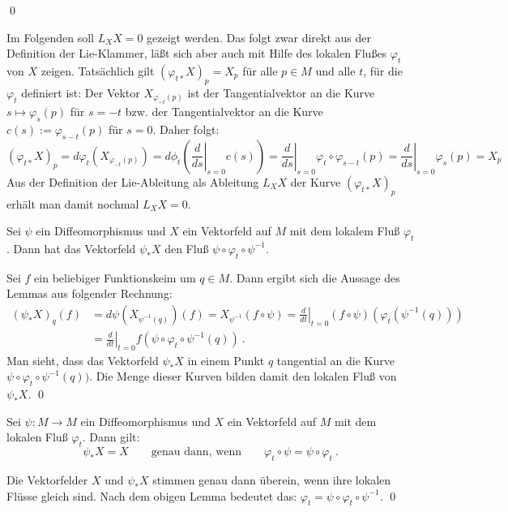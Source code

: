\documentclass[%
	paper=a5,%
	fleqn,%
	DIV=18,%
	BCOR=0mm,
	fontsize=11pt,
	titlepage=false,%
	bibliography=totoc,
	DIV=18,%
	twoside=true,
	pdftitle=Riemannsche Geometrie,
	pdfauthor=Uwe Semmelmann,
	numbers=noendperiod]%
	{scrbook}
\begin{document}
\qed

\bigskip

Im Folgenden soll $L_XX=0$ gezeigt werden. Das folgt zwar direkt aus der Definition der Lie-Klammer,
l\"a\ss t sich aber auch mit Hilfe des lokalen Flu\ss es $\varphi_t$ von $X$ zeigen.  Tats\"achlich
gilt $(\varphi_{t*}X)_p=X_p$ f\"ur alle $p\in M$ und alle $t$, f\"ur die $\varphi_t$ definiert ist:
Der Vektor $X_{\varphi_{-t}(p)}$ ist der Tangentialvektor an die Kurve $s\mapsto \varphi_s(p)$
f\"ur $s=-t$ bzw. der Tangentialvektor an die Kurve $c(s):=\varphi_{s-t}(p)$ f\"ur $s=0$.
Daher folgt:
$$
(\varphi_{t*}X)_p=d\varphi_t(X_{\varphi_{-t}(p)}) = d\phi_t \left(\left.\frac{d}{ds}\right|_{s=0} c(s) \right)
=\left.\frac{d}{ds}\right|_{s=0} \varphi_t\circ\varphi_{s-t}(p)
=\left.\frac{d}{ds}\right|_{s=0}\varphi_s(p) = X_p
$$
Aus der Definition der Lie-Ableitung als Ableitung $L_XX$ der Kurve $(\varphi_{t*}X)_p$ erh\"alt man
damit nochmal $L_XX=0$.

\bigskip

\begin{Lemma}
Sei $\psi$ ein Diffeomorphismus und $X$ ein Vektorfeld auf $M$ mit dem lokalem Flu\ss{}
$\varphi_t$. Dann hat das Vektorfeld $\psi_*X$ den Flu\ss{} $\psi\circ \varphi_t \circ \psi^{-1}$.\fish
\end{Lemma}
\proof
Sei $f$ ein beliebiger Funktionskeim um $q\in M$. Dann ergibt sich die Aussage des Lemmas
aus folgender Rechnung:
$$
\begin{array}{rl}
(\psi_* X)_q(f) &= d\psi (X_{\psi^{-1}(q)})(f)
=
X_{\psi^{-1}} (f\circ \psi)
=
\left.\frac{d}{dt}\right|_{t=0} (f\circ \psi)(\varphi_t(\psi^{-1}(q)))\\[1ex]
& =
\left.\frac{d}{dt}\right|_{t=0} f(\psi \circ \varphi_t \circ \psi^{-1}(q)) \ .
\end{array}
$$
Man sieht, dass das Vektorfeld $\psi_* X$ in einem Punkt $q$ tangential an die
Kurve $\psi \circ \varphi_t \circ \psi^{-1}(q))$. Die Menge dieser Kurven bilden
damit den lokalen Flu\ss{} von $\psi_* X$.
\qed

\bigskip

\begin{Folgerung}\label{folgerung}
Sei $\psi : M \rightarrow M$ ein Diffeomorphismus und $X$ ein Vektorfeld auf $M$ mit
dem lokalen Flu\ss{} $\varphi_t$. Dann gilt:
$$
\psi_* X = X \qquad \mbox{genau dann, wenn} \qquad
\varphi_t \circ \psi = \psi \circ \varphi_t \ .
$$
\end{Folgerung}
\proof
Die Vektorfelder $X$ und $\psi_*X$ stimmen genau dann \"uberein, wenn ihre lokalen
Fl\"usse gleich sind. Nach dem  obigen Lemma bedeutet das:
$\varphi_t = \psi \circ \varphi_t \circ \psi^{-1}$.
\qed
\end{document}
